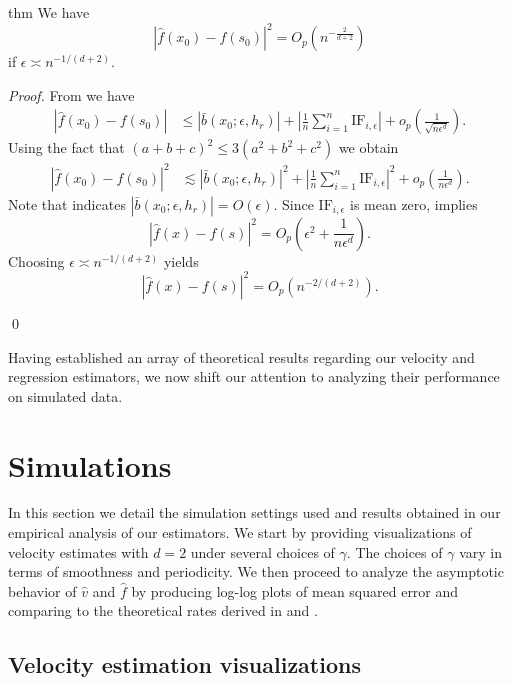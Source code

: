 \documentclass[11pt]{article}
\begin{document}
\begin{restatable}{thm}{} 
    We have
    \[\left|\hat{f}(x_0) - f(s_0)\right|^2 = O_p\left(n^{-\frac{2}{d+2}}\right) \]
    if $\epsilon \asymp n^{-1/(d+2)}$.
\end{restatable}
\noindent \textit{Proof.} From  we have
\begin{align}
    \left|\hat{f}(x_0) - f(s_0)\right| &\leq\left|\bar{b}(x_0; \epsilon, h_r)\right| + \left|\frac{1}{n}\sum_{i = 1}^n\text{IF}_{i, \epsilon} \right| + o_p\left(\frac{1}{\sqrt{n\epsilon^d}}\right).
\end{align}
Using the fact that $(a+b+c)^2 \leq 3(a^2 + b^2 + c^2)$ we obtain
\begin{align}
    \left|\hat{f}(x_0) - f(s_0)\right|^2 &\lesssim \left|\bar{b}(x_0; \epsilon, h_r)\right|^2 + \left|\frac{1}{n}\sum_{i = 1}^n\text{IF}_{i, \epsilon}\right|^2 + o_p\left(\frac{1}{n\epsilon^d}\right).
\end{align}
Note that  indicates $|\bar{b}(x_0; \epsilon, h_r)| = O(\epsilon)$. Since $\text{IF}_{i, \epsilon}$ is mean zero,  implies
\[ \left|\hat{f}(x) - f(s)\right|^2 =  O_p\left(\epsilon^2 + \frac{1}{n\epsilon^d}\right).\]
Choosing $\epsilon \asymp n^{-1/(d+2)}$ yields
    \[\left|\hat{f}(x) - f(s)\right|^2 = O_p\left(n^{-2/(d+2)}\right). \]

\qed{}

Having established an array of theoretical results regarding our velocity and regression estimators, we now shift our attention to analyzing their performance on simulated data. 

\section{Simulations}

In this section we detail the simulation settings used and results obtained in our empirical analysis of our estimators. We start by providing visualizations of velocity estimates with $d = 2$ under several choices of $\gamma$. The choices of $\gamma$ vary in terms of smoothness and periodicity. We then proceed to analyze the asymptotic behavior of $\hat v$ and $\hat f$ by producing log-log plots of mean squared error and comparing to the theoretical rates derived in  and . 

\subsection{Velocity estimation visualizations}
\end{document}
